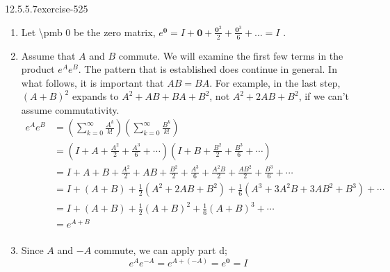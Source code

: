 \documentclass[twoside,10pt,]{book}
\numberwithin{equation}{section}
\begin{document}
\begin{divisionsolution}{12.5.5.7}{}{exercise-525}
\begin{enumerate}[label=(\alph*)]
\right)\)%
\item\hypertarget{li-2150}{}\hypertarget{p-4719}{}%
Let \textbackslash{}pmb\textbraceleft{} 0\textbraceright{} be the zero matrix, \(e^{\pmb{0}}=I + \pmb{0}+\frac{\pmb{0}^2}{2}+\frac{\pmb{0}^3}{6}+\ldots =I\) .%
\item\hypertarget{li-2151}{}\hypertarget{p-4720}{}%
Assume that \(A\) and \(B\) commute. We will examine the first few terms in the product \(e^A e^B\). The pattern that is established does continue in general. In what follows, it is important that \(A B = B A\). For example, in the last step,   \((A+B)^2\) expands to \(A^2+A
B + B A + B^2\), not \(A^2+ 2 A B + B^2\),  if we can't assume commutativity.%
\begin{equation*}
\begin{split}
e^Ae^B &= \left(\sum _{k=0}^{\infty } \frac{A^k}{k!}\right) \left(\sum _{k=0}^{\infty } \frac{B^k}{k!}\right)\\
& =\left(I + A+\frac{A^2}{2}+ \frac{A^3}{6}+ \cdots \right)\left(I +B+\frac{B^2}{2}+ \frac{B^3}{6}+ \cdots \right)\\
&= I + A + B+ \frac{A^2}{2}+ A B + \frac{B^2}{2}+\frac{A^3}{6}+ \frac{A^2B}{2}+\frac{A B^2}{2}+ \frac{B^3}{6}+\cdots \\
&= I + (A+B) + \frac{1}{2}\left(A^2+ 2 A B + B^2\right)+ \frac{1}{6}\left(A^3+ 3A^2B+ 3A B^2+ B^3\right)+\cdots \\
&=I + (A+B)+ \frac{1}{2}(A+B)^2+ \frac{1}{6}(A+B)^3+\cdots \\
& =e^{A+B}\\
\end{split}
\end{equation*}
%
\item\hypertarget{li-2152}{}\hypertarget{p-4721}{}%
Since \(A\) and \(-A\) commute, we can apply part d;%
\begin{equation*}
e^Ae^{-A} = e^{A+(-A)} =e^{\pmb{0}} =I
\end{equation*}
%
\end{enumerate}
%
\end{divisionsolution}%
\end{document}
